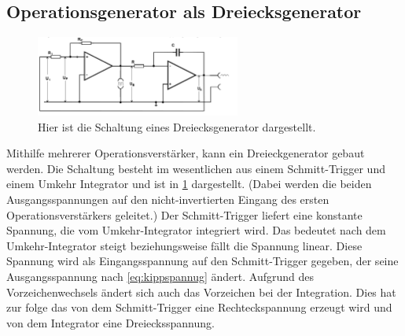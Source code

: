 \subsection{Operationsgenerator als Dreiecksgenerator}
\begin{figure}[h!]
	\centering
	\includegraphics[width = 0.6\textwidth]{../Grafiken/Dreieckgenerator.png}
	\caption{Hier ist die Schaltung eines Dreiecksgenerator dargestellt. \cite{V51} \label{fig:Dreieck}}
\end{figure}
\noindent
Mithilfe mehrerer Operationsverstärker, kann ein Dreieckgenerator gebaut werden.
Die Schaltung besteht im wesentlichen aus einem Schmitt-Trigger und einem Umkehr Integrator und ist in \cref{fig:Dreieck} dargestellt.
(Dabei werden die beiden Ausgangsspannungen auf den nicht-invertierten Eingang des ersten Operationsverstärkers geleitet.)
Der Schmitt-Trigger liefert eine konstante Spannung, die vom Umkehr-Integrator integriert wird.
Das bedeutet nach dem Umkehr-Integrator steigt beziehungsweise fällt die Spannung linear. 
Diese Spannung wird als Eingangsspannung auf den Schmitt-Trigger gegeben, der seine Ausgangsspannung nach \cref{eq:kippspannug} ändert.
Aufgrund des Vorzeichenwechsels ändert sich auch das Vorzeichen bei der Integration.
Dies hat zur folge das von dem Schmitt-Trigger eine Rechteckspannung erzeugt wird und von dem Integrator eine Dreiecksspannung.

